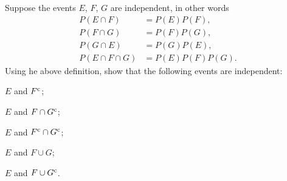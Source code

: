 \begin{problem}
  Suppose the events \(E\), \(F\), \(G\) are independent, in other words
  \begin{align*}
    P(E\cap F)&=P(E)P(F),\\
    P(F\cap G)&=P(F)P(G),\\
    P(G\cap E)&=P(G)P(E),\\
    P(E\cap F\cap G)&=P(E)P(F)P(G).
  \end{align*}
  Using he above definition, show that the following events are
  independent:
  \begin{alphlist}
  \item \(E\) and \(F^{\mathrm{c}}\);
  \item \(E\) and \(F\cap G^{\mathrm{c}}\);
  \item \(E\) and \(F^{\mathrm{c}}\cap G^{\mathrm{c}}\);
  \item \(E\) and \(F\cup G\);
  \item \(E\) and \(F\cup G^{\mathrm{c}}\).
  \end{alphlist}
\end{problem}
